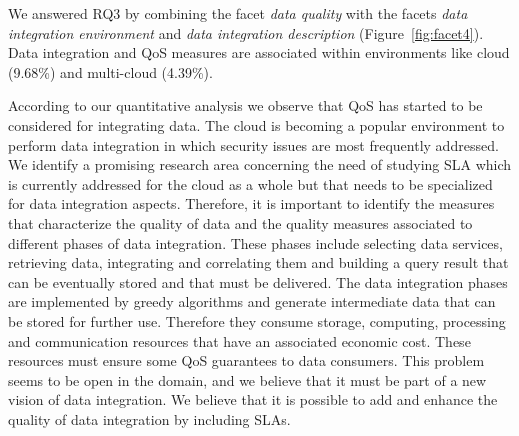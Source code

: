 We answered RQ3 by combining the facet {\em data quality} with the facets {\em data integration environment} and {\em data integration description}
(Figure~\ref{fig:facet4}).  Data integration and QoS measures are associated within environments like cloud  (9.68\%) and multi-cloud (4.39\%).

According to our quantitative analysis we observe that QoS has started to be
considered for integrating data. 
 The cloud is becoming a popular environment to
perform data integration in which security issues are most frequently addressed.
We identify a promising research area concerning the need of studying SLA which
is currently addressed  for the cloud as a whole \cite{PedrinaciCL14} but that
needs to be specialized for data integration aspects. Therefore, it is important
to identify the measures that characterize the quality of data and  the
quality measures associated to different phases of data integration. These phases include selecting
data services, retrieving data, integrating and correlating them and building a
query result that can be eventually stored and that must be delivered. The data integration phases are implemented by greedy algorithms and generate intermediate data that
can be stored for further use. Therefore they consume storage, computing,
processing and communication resources that have an associated economic cost. These resources 
 must ensure some QoS guarantees to data consumers. This problem seems to be
open in the domain, and we believe that it must be part of  a new vision of data
integration. We believe that it is possible to add and enhance the quality of
data integration by including SLAs.                   
